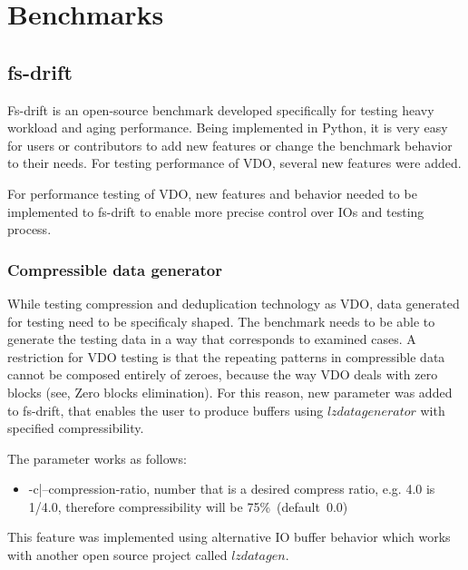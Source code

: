 \documentclass[
  color, %
  table, %
  lof,   %
  lot,   %
]{fithesis3}
\begin{document}
\chapter{Benchmarks}
\label{benchmarks}

\section{fs-drift}
Fs-drift is an open-source benchmark developed specifically for testing heavy workload and aging performance. Being implemented in Python, it is very easy for users or contributors to add new features or change the benchmark behavior to their needs. For testing performance of VDO, several new features were added.

For performance testing of VDO, new features and behavior needed to be implemented to fs-drift to enable more precise control over IOs and testing process.

\subsection{Compressible data generator}
While testing compression and deduplication technology as VDO, data generated for testing need to be specificaly shaped. The benchmark needs to be able to generate the testing data in a way that corresponds to examined cases. A restriction for VDO testing is that the repeating patterns in compressible data cannot be composed entirely of zeroes, because the way VDO deals with zero blocks (see, Zero blocks elimination). For this reason, new parameter was added to fs-drift, that enables the user to produce buffers using $lzdatagenerator$ with specified compressibility.

The parameter works as follows:
\begin{itemize}
    \item -c|--compression-ratio, number that is a desired compress ratio, e.g. 4.0 is 1/4.0, therefore compressibility will be 75\%~(default~0.0)
\end{itemize}

This feature was implemented using alternative IO buffer behavior which works with another open source project called $lzdatagen$.
\end{document}

